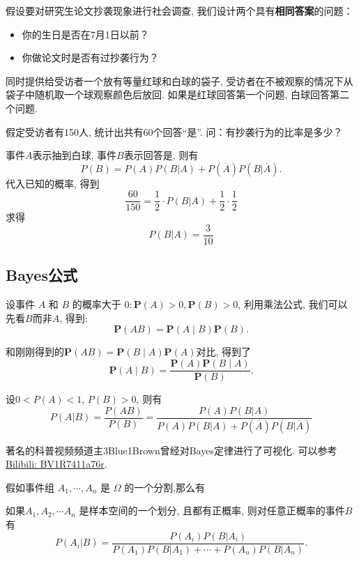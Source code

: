 \begin{example}
    假设要对研究生论文抄袭现象进行社会调查, 我们设计两个具有\textbf{相同答案}的问题：
    \begin{itemize}
        \item 你的生日是否在7月1日以前？
        \item 你做论文时是否有过抄袭行为？
    \end{itemize}
    同时提供给受访者一个放有等量红球和白球的袋子, 
    受访者在不被观察的情况下从袋子中随机取一个球观察颜色后放回. 
    如果是红球回答第一个问题, 白球回答第二个问题. 

    假定受访者有150人, 统计出共有60个回答“是”. 问：有抄袭行为的比率是多少？
\end{example}

\begin{solution}
    事件$A$表示抽到白球, 事件$B$表示回答是, 则有
    $$P(B)=P(A)P(B|A)+P(\overline{A})P(B|\overline{A}).$$
    代入已知的概率, 得到
    $$\frac{60}{150}=\frac12\cdot P(B|A)+\frac12\cdot\frac12 $$
    求得
    $$P(B|A)=\frac{3}{10}$$
\end{solution}

\subsection{Bayes公式}
设事件 $A$ 和 $B$ 的概率大于 $0: \mathbf{P}(A)>0, \mathbf{P}(B)>0$, 利用乘法公式, 我们可以先看$B$而非$A$, 得到: 
$$\mathbf{P}(A B)=\mathbf{P}(A \mid B) \mathbf{P}(B).$$

和刚刚得到的$\mathbf{P}(A B)=\mathbf{P}(B \mid A) \mathbf{P}(A)$对比, 得到了$$\mathbf{P}(A \mid B)=\frac{\mathbf{P}(A) \mathbf{P}(B \mid A)}{\mathbf{P}(B)}.$$

\begin{theorem}[Bayes定理]
    设$0<P(A)<1$, $P(B)>0$, 则有
    $$P(A|B)=\frac{P(AB)}{P(B)}
        =\frac{P(A)P(B|A)}{P(A)P(B|A)+P(\overline{A})P(B|\overline{A})}$$
\end{theorem}

\begin{webaside}
    著名的科普视频频道主3Blue1Brown曾经对Bayes定律进行了可视化. 可以参考\href{https://www.bilibili.com/video/BV1R7411a76r}{Bilibili: BV1R7411a76r}.
\end{webaside}
假如事件组 $A_1, \cdots, A_n$ 是 $\Omega$ 的一个分割,那么有

\begin{corollary}
    如果$A_1, A_2, \cdots A_n$ 是样本空间的一个划分, 且都有正概率, 则对任意正概率的事件$B$有
    \[
        P(A_i|B)=\frac{P(A_i)P(B|A_i)}{P(A_1)P(B|A_1)+\cdots+P(A_n)P(B|A_n)}.%
    \]
\end{corollary}

